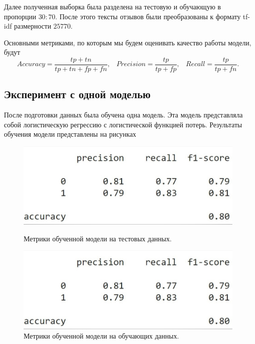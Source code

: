 \documentclass[12pt, twoside]{article}
\begin{document}
Далее полученная выборка была разделена на тестовую и обучающую в пропорции $30:70$. После этого тексты отзывов были преобразованы к формату tf-idf размерности $25770$.

Основными метриками, по которым мы будем оценивать качество работы модели, будут
\[Accuracy = \frac{tp + tn}{tp + tn + fp + fn}, \hspace{10pt} Precision = \frac{tp}{tp + fp}, \hspace{10pt} Recall = \frac{tp}{tp + fn}.\]


\subsection{Эксперимент с одной моделью}
После подготовки данных была обучена одна модель. Эта модель представляла собой логистическую регрессию с логистической функцией потерь. Результаты обучения модели представлены на рисунках
\begin{figure}[h]
\begin{center}
\begin{minipage}[h]{0.4\linewidth}
\includegraphics[width=1\linewidth]{fig/res.jpg}
\caption{Метрики обученной модели на тестовых данных.} %
\end{minipage}
\hfill
\begin{minipage}[h]{0.4\linewidth}
\includegraphics[width=1\linewidth]{fig/res.jpg}
\caption{Метрики обученной модели на обучающих данных.}
\end{minipage}
\end{center}
\end{figure}
 
\end{document}
